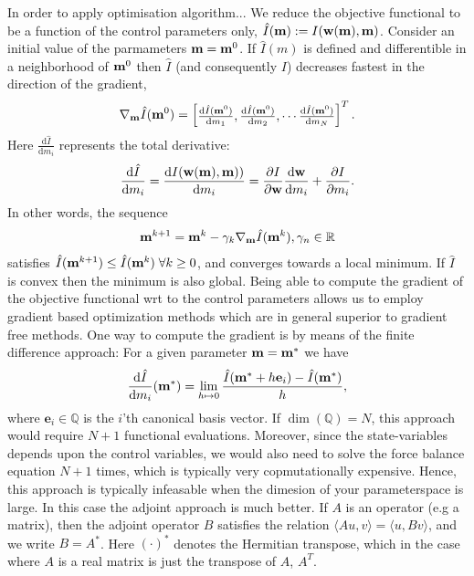 In order to apply optimisation algorithm...
We reduce the objective functional to be a function of the control
parameters only, $\hat{I}(\mathbf{m}) := I(\mathbf{w}(\mathbf{m}), \mathbf{m})$. Consider an
initial value of the parmameters $\mathbf{m} = \mathbf{m}^0$. If $\hat{I}(m)$ is defined
and differentible in a neighborhood of $\mathbf{m}^0$ then $\hat{I}$ (and
consequently $I$) decreases fastest in the direction of the gradient, 
\begin{align}
  \nabla_{\mathbf{m}} \hat{I}(\mathbf{m}^0) = \begin{bmatrix}
    \frac{\mathrm{d} \hat{I}(\mathbf{m}^0) }{\mathrm{d} m_1},
    \frac{\mathrm{d} \hat{I}(\mathbf{m}^0) }{\mathrm{d} m_2},
    \cdots
    \frac{\mathrm{d} \hat{I}(\mathbf{m}^0) }{\mathrm{d} m_N}
  \end{bmatrix}^T.
  \label{eq:functional_gradient}
\end{align}
Here $\frac{\mathrm{d} \hat{I} }{\mathrm{d} m_i}$ represents the
total derivative:
\begin{align}
  \frac{\mathrm{d} \hat{I} }{\mathrm{d} m_i} = \frac{\mathrm{d} I (\mathbf{w}(\mathbf{m}), \mathbf{m}))}{\mathrm{d} m_i} = \frac{\partial  I }{\partial \mathbf{w}} \frac{\mathrm{d} \mathbf{w}}{\mathrm{d} m_i} + \frac{\partial  I }{\partial m_i}.
  \label{eq:functional_derivative_component}
\end{align}
In other words, the sequence
\begin{align}
  \mathbf{m}^{k+1} = \mathbf{m}^{k} - \gamma_k \nabla_{\mathbf{m}} \hat{I}(\mathbf{m}^k), \gamma_n \in \mathbb{R}
\end{align}
satisfies $\hat{I}(\mathbf{m}^{k+1}) \leq \hat{I}(\mathbf{m}^k) \; \forall k \geq
0$, and converges towards a local minimum. If $\hat{I}$ is convex then
the minimum is also global.
Being able to compute the gradient of the objective functional wrt to
the control parameters allows us to employ gradient based optimization
methods which are in general superior to gradient free methods.
One way to compute the gradient is by means of the finite difference
approach: For a given parameter $\mathbf{m} = \mathbf{m}^*$ we have
\begin{align}
  \frac{\mathrm{d} \hat{I} }{\mathrm{d} m_i}( \mathbf{m}^*) =
  \lim_{h \mapsto 0} \frac{\hat{I}(\mathbf{m}^* + h\mathbf{e}_i) - \hat{I}(\mathbf{m}^*)}{h}, 
\end{align}
where $\mathbf{e}_i \in \mathbb{Q}$ is the $i$'th canonical basis
vector. If $\dim(\mathbb{Q}) = N$, this approach would require $N+1$
functional evaluations. Moreover, since the state-variables depends upon the
control variables, we would also need to solve the force balance
equation $N+1$ times, which is typically very copmutationally
expensive. Hence, this approach is typically infeasable when the
dimesion of your parameterspace is large. In this case the adjoint
approach is much better. If $A$ is an operator (e.g a matrix), then
the adjoint operator $B$ satisfies the relation $\langle Au, v \rangle
= \langle u, Bv \rangle$, and we write $ B = A^*$. Here $(\cdot)^*$
denotes the Hermitian transpose, which in the case where $A$ is a real
matrix is just the transpose of $A$, $A^T$.  


